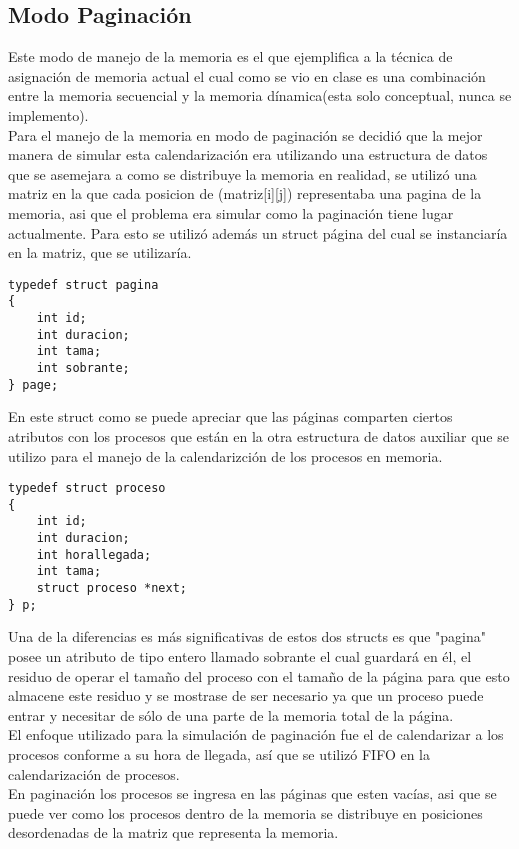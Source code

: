 \documentclass[10pt,a4paper]{article}
\begin{document}
\subsection{Modo Paginación}
Este modo de manejo de la memoria es el que ejemplifica a la técnica de asignación de memoria actual el cual como se vio en clase es una combinación entre la memoria secuencial y la memoria dínamica(esta solo conceptual, nunca se implemento).\\
Para el manejo de la memoria en modo de paginación se decidió que la mejor manera de simular esta calendarización era utilizando una estructura de datos que se asemejara a como se distribuye la memoria en realidad, se utilizó una matriz en la que cada posicion de (matriz[i][j]) representaba una pagina de la memoria, asi que el problema era simular como la paginación tiene lugar actualmente.
Para esto se utilizó además un struct página del cual se instanciaría en la matriz, que se utilizaría.
\hfill
\hfill
\break
\begin{verbatim}
typedef struct pagina
{
    int id;
    int duracion;
    int tama;
    int sobrante;
} page;
\end{verbatim} 
\hfill
\hfill
\break
En este struct como se puede apreciar que las páginas comparten ciertos atributos con los procesos que están en  la otra estructura de datos auxiliar que se utilizo para el manejo de la calendarizción de los procesos en memoria.
\hfill
\hfill
\break
\begin{verbatim}
typedef struct proceso
{
    int id;
    int duracion;
    int horallegada;
    int tama;
    struct proceso *next;
} p;
\end{verbatim}
\hfill
\hfill
\break
Una de la diferencias es más significativas de estos dos structs es que "pagina" posee un atributo de tipo entero llamado sobrante el cual guardará en él, el residuo de operar el tamaño del proceso con el tamaño de la página para que esto almacene este residuo y se mostrase  de ser necesario ya que un proceso puede entrar y necesitar de sólo de una parte de la memoria total de la página.\\
El enfoque utilizado para la simulación de paginación fue el de calendarizar a los procesos conforme a su hora de llegada, así que se utilizó FIFO en la calendarización de procesos.\\
En paginación los procesos se ingresa en las páginas que esten vacías, asi que se puede ver como los procesos dentro de la memoria se distribuye en posiciones desordenadas de la matriz que representa la memoria.\\
\end{document}
